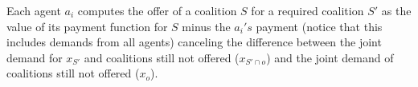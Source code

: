 \documentclass[11pt, twoside, titlepage, a4paper, openright]{report}
\begin{document}
Each agent $a_i$ computes the offer of a coalition $S$ for a
required coalition $S'$ as the value of its payment function for $S$
minus the $a_i's$ payment (notice that this includes demands from all agents)
canceling the difference between the joint demand for $x_{S'}$ and coalitions
still not offered ($x_{S'\cap o}$) and the joint demand of coalitions
still not offered ($x_{o}$).
\end{document}
